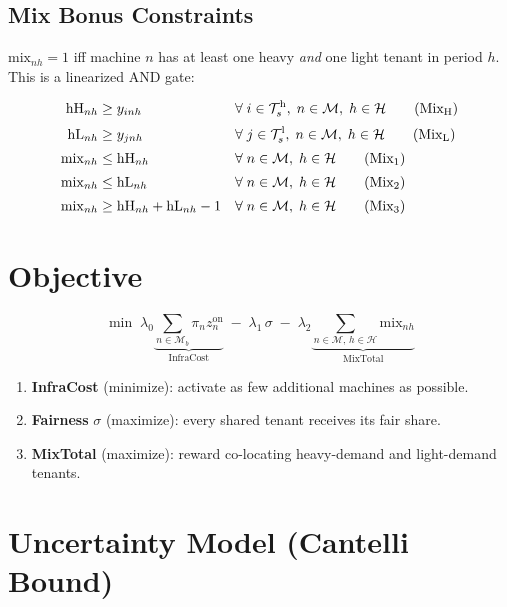 \documentclass[11pt,a4paper]{article}
\newcommand{\Th}{\mathcal{T}_s^{\mathrm{h}}}
\newcommand{\Tl}{\mathcal{T}_s^{\mathrm{l}}}
\newcommand{\M}{\mathcal{M}}
\newcommand{\Mb}{\mathcal{M}_b}
\newcommand{\PH}{\mathcal{H}}
\begin{document}
\subsection{Mix Bonus Constraints}

$\mathrm{mix}_{nh}=1$ iff machine $n$ has at least one heavy \emph{and} one light tenant in period $h$.
This is a linearized AND gate:

\begin{align}
  \mathrm{hH}_{nh} &\geq y_{inh} & &\forall\; i\in\Th,\; n\in\M,\; h\in\PH
    \tag{Mix$_{\mathrm{H}}$}\\[2pt]
  \mathrm{hL}_{nh} &\geq y_{jnh} & &\forall\; j\in\Tl,\; n\in\M,\; h\in\PH
    \tag{Mix$_{\mathrm{L}}$}\\[2pt]
  \mathrm{mix}_{nh} &\leq \mathrm{hH}_{nh} & &\forall\; n\in\M,\; h\in\PH
    \tag{Mix$_1$}\\[2pt]
  \mathrm{mix}_{nh} &\leq \mathrm{hL}_{nh} & &\forall\; n\in\M,\; h\in\PH
    \tag{Mix$_2$}\\[2pt]
  \mathrm{mix}_{nh} &\geq \mathrm{hH}_{nh}+\mathrm{hL}_{nh}-1 & &\forall\; n\in\M,\; h\in\PH
    \tag{Mix$_3$}
\end{align}

\section{Objective}

\begin{equation}
\boxed{
\min\;
  \lambda_0\!\underbrace{\sum_{n\in\Mb}\!\pi_n z^{\mathrm{on}}_n}_{\text{InfraCost}}
  \;-\;
  \lambda_1\,\sigma
  \;-\;
  \lambda_2\!\underbrace{\sum_{n\in\M,\,h\in\PH}\!\mathrm{mix}_{nh}}_{\text{MixTotal}}
}
\end{equation}

\begin{enumerate}[label=(\arabic*)]
  \item \textbf{InfraCost} (minimize): activate as few additional machines as possible.
  \item \textbf{Fairness} $\sigma$ (maximize): every shared tenant receives its fair share.
  \item \textbf{MixTotal} (maximize): reward co-locating heavy-demand and light-demand tenants.
\end{enumerate}

\section{Uncertainty Model (Cantelli Bound)}
\end{document}
